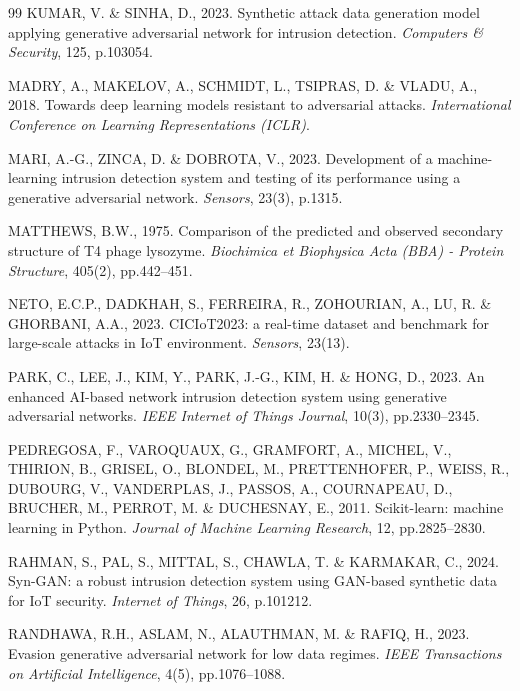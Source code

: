 \documentclass[10pt,twocolumn,a4paper]{extarticle}
\begin{document}
\begin{thebibliography}{99}
KUMAR, V. \& SINHA, D., 2023. Synthetic attack data generation model applying generative adversarial network for intrusion detection. \textit{Computers \& Security}, 125, p.103054.

MADRY, A., MAKELOV, A., SCHMIDT, L., TSIPRAS, D. \& VLADU, A., 2018. Towards deep learning models resistant to adversarial attacks. \textit{International Conference on Learning Representations (ICLR)}.

MARI, A.-G., ZINCA, D. \& DOBROTA, V., 2023. Development of a machine-learning intrusion detection system and testing of its performance using a generative adversarial network. \textit{Sensors}, 23(3), p.1315.

MATTHEWS, B.W., 1975. Comparison of the predicted and observed secondary structure of T4 phage lysozyme. \textit{Biochimica et Biophysica Acta (BBA) - Protein Structure}, 405(2), pp.442--451.

NETO, E.C.P., DADKHAH, S., FERREIRA, R., ZOHOURIAN, A., LU, R. \& GHORBANI, A.A., 2023. CICIoT2023: a real-time dataset and benchmark for large-scale attacks in IoT environment. \textit{Sensors}, 23(13).

PARK, C., LEE, J., KIM, Y., PARK, J.-G., KIM, H. \& HONG, D., 2023. An enhanced AI-based network intrusion detection system using generative adversarial networks. \textit{IEEE Internet of Things Journal}, 10(3), pp.2330--2345.

PEDREGOSA, F., VAROQUAUX, G., GRAMFORT, A., MICHEL, V., THIRION, B., GRISEL, O., BLONDEL, M., PRETTENHOFER, P., WEISS, R., DUBOURG, V., VANDERPLAS, J., PASSOS, A., COURNAPEAU, D., BRUCHER, M., PERROT, M. \& DUCHESNAY, E., 2011. Scikit-learn: machine learning in Python. \textit{Journal of Machine Learning Research}, 12, pp.2825--2830.

RAHMAN, S., PAL, S., MITTAL, S., CHAWLA, T. \& KARMAKAR, C., 2024. Syn-GAN: a robust intrusion detection system using GAN-based synthetic data for IoT security. \textit{Internet of Things}, 26, p.101212.

RANDHAWA, R.H., ASLAM, N., ALAUTHMAN, M. \& RAFIQ, H., 2023. Evasion generative adversarial network for low data regimes. \textit{IEEE Transactions on Artificial Intelligence}, 4(5), pp.1076--1088.


\end{thebibliography}
\end{document}
